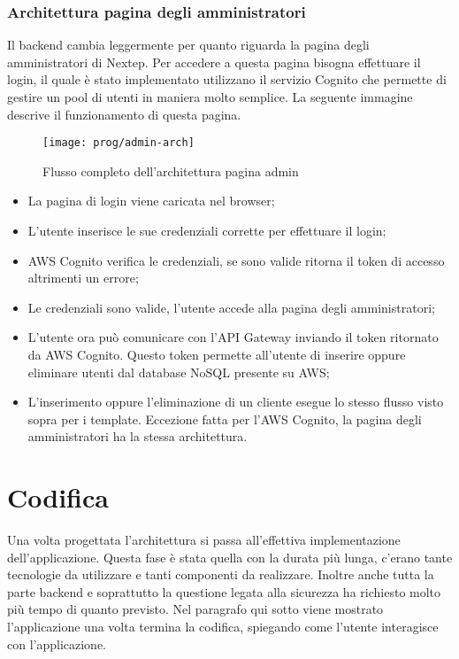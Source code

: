 \subsubsection{Architettura pagina degli amministratori}
Il backend cambia leggermente per quanto riguarda la pagina degli amministratori di Nextep. Per accedere a questa pagina bisogna effettuare il login, il quale è stato implementato utilizzano il servizio Cognito che permette di gestire un pool di utenti in maniera molto semplice. La seguente immagine descrive il funzionamento di questa pagina. 
\begin{figure}[!h] 
	\centering 
	\texttt{[image: prog/admin-arch]} 
	\caption{Flusso completo dell'architettura pagina admin}
\end{figure} 
\begin{itemize}
	\item La pagina di login viene caricata nel browser;
	\item L'utente inserisce le sue credenziali corrette per effettuare il login;
	\item AWS Cognito verifica le credenziali, se sono valide ritorna il token di accesso altrimenti un errore;
	\item Le credenziali sono valide, l'utente accede alla pagina degli amministratori;
	\item L'utente ora può comunicare con l'API Gateway inviando il token ritornato da AWS Cognito. Questo token permette all'utente di inserire oppure eliminare utenti dal database NoSQL presente su AWS;
	\item L'inserimento oppure l'eliminazione di un cliente esegue lo stesso flusso visto sopra per i template. Eccezione fatta per l'AWS Cognito, la pagina degli amministratori ha la stessa architettura.
\end{itemize}
\newpage
\section{Codifica}

Una volta progettata l’architettura 
si passa all’effettiva implementazione dell'applicazione.
 Questa fase è stata quella con la durata più lunga, c'erano tante tecnologie da utilizzare e tanti componenti da realizzare. Inoltre anche tutta la parte backend e soprattutto la questione legata alla sicurezza ha richiesto molto più tempo di quanto previsto. Nel paragrafo qui sotto viene mostrato l'applicazione una volta termina la codifica, spiegando come l'utente interagisce con l'applicazione. 

